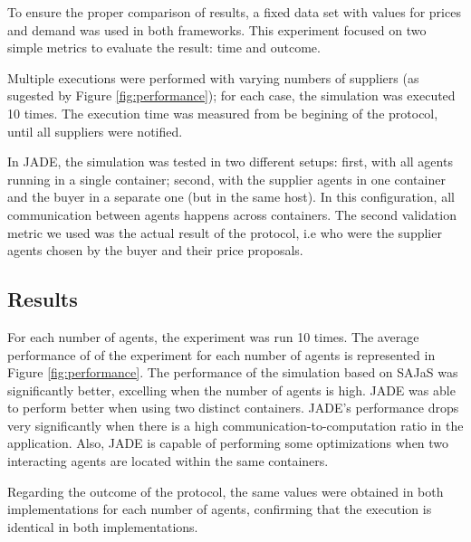 To ensure the proper comparison of results, a fixed data set with values for prices and demand was used in both frameworks. This experiment focused on two simple metrics to evaluate the result: time and outcome. 

Multiple executions were performed with varying numbers of suppliers (as sugested by Figure \ref{fig:performance}); for each case, the simulation was executed 10 times. The execution time was measured from be begining of the protocol, until all suppliers were notified.

In JADE, the simulation was tested in two different setups: first, with all agents running in a single container; second, with the supplier agents in one container and the buyer in a separate one (but in the same host). In this configuration, all communication between agents happens across containers. The second validation metric we used was the actual result of the protocol, i.e who were the supplier agents chosen by the buyer and their price proposals.

\subsection{Results}

For each number of agents, the experiment was run 10 times. The average performance of of the experiment for each number of agents is represented in Figure \ref{fig:performance}. The performance of the simulation based on SAJaS was significantly better, excelling when the number of agents is high. JADE was able to perform better when using two distinct containers. JADE's performance drops very significantly when there is a high communication-to-computation ratio in the application. Also, JADE is capable of performing some optimizations when two interacting agents are located within the same containers\cite{mengistu2008scalability}.

Regarding the outcome of the protocol, the same values were obtained in both implementations for each number of agents, confirming that the execution is identical in both implementations.

